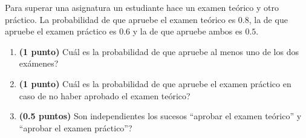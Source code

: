 
Para superar una asignatura un estudiante hace un examen teórico y otro práctico. La probabilidad de que apruebe el examen teórico es $0.8$, la de que apruebe el examen práctico es $0.6$ y la de que apruebe ambos es $0.5$.
\begin{enumerate}[label=\alph*)]
\item \textbf{(1 punto)} \textquestiondown{}Cuál es la probabilidad de que apruebe al menos uno de los dos exámenes?
\item \textbf{(1 punto)} \textquestiondown{}Cuál es la probabilidad de que apruebe el examen práctico en caso de no haber aprobado el examen teórico?
\item \textbf{(0.5 puntos)} \textquestiondown{}Son independientes los sucesos ``aprobar el examen teórico'' y ``aprobar el examen práctico''?
\end{enumerate}
